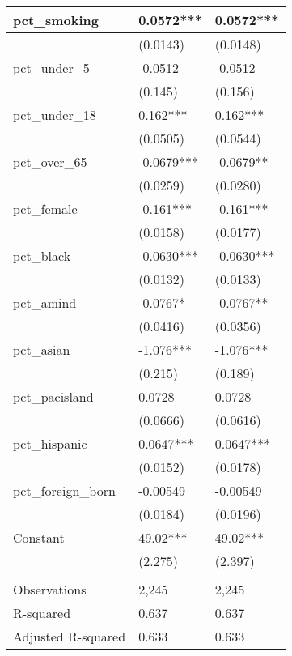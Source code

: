 \begin{tabular}{|l|l|l|}
pct\_smoking & 0.0572*** & 0.0572*** \\      \hline
 & (0.0143) & (0.0148) \\      \hline
pct\_under\_5 & -0.0512 & -0.0512 \\      \hline
 & (0.145) & (0.156) \\      \hline
pct\_under\_18 & 0.162*** & 0.162*** \\      \hline
 & (0.0505) & (0.0544) \\      \hline
pct\_over\_65 & -0.0679*** & -0.0679** \\      \hline
 & (0.0259) & (0.0280) \\      \hline
pct\_female & -0.161*** & -0.161*** \\      \hline
 & (0.0158) & (0.0177) \\      \hline
pct\_black & -0.0630*** & -0.0630*** \\      \hline
 & (0.0132) & (0.0133) \\      \hline
pct\_amind & -0.0767* & -0.0767** \\      \hline
 & (0.0416) & (0.0356) \\      \hline
pct\_asian & -1.076*** & -1.076*** \\      \hline
 & (0.215) & (0.189) \\      \hline
pct\_pacisland & 0.0728 & 0.0728 \\      \hline
 & (0.0666) & (0.0616) \\      \hline
pct\_hispanic & 0.0647*** & 0.0647*** \\      \hline
 & (0.0152) & (0.0178) \\      \hline
pct\_foreign\_born & -0.00549 & -0.00549 \\      \hline
 & (0.0184) & (0.0196) \\      \hline
Constant & 49.02*** & 49.02*** \\      \hline
 & (2.275) & (2.397) \\      \hline
 &  &  \\      \hline
Observations & 2,245 & 2,245 \\      \hline
R-squared & 0.637 & 0.637 \\      \hline
 Adjusted R-squared & 0.633 & 0.633 \\      \hline 
\end{tabular}

